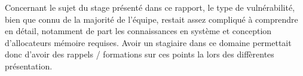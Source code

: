 Concernant le sujet du stage présenté dans ce rapport, le type de vulnérabilité, bien que connu de la majorité de l'équipe, restait assez compliqué à comprendre en détail, notamment de part les connaissances en système et conception d'allocateurs mémoire requises. Avoir un stagiaire dans ce domaine permettait donc d'avoir des rappels / formations sur ces points la lors des diffèrentes présentation.


\paragraph{}
\subparagraph{}
\newpage
